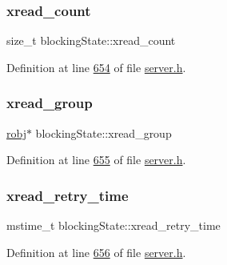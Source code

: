 \subsubsection{\texorpdfstring{xread\+\_\+count}{xread\_count}}
{\footnotesize\ttfamily size\+\_\+t blocking\+State\+::xread\+\_\+count}



Definition at line \hyperlink{server_8h_source_l00654}{654} of file \hyperlink{server_8h_source}{server.\+h}.

\mbox{\label{structblockingState_a2989cf7dbfeca2206cacadbff15e76cf}} 
\subsubsection{\texorpdfstring{xread\+\_\+group}{xread\_group}}
{\footnotesize\ttfamily \hyperlink{structredisObject}{robj}$\ast$ blocking\+State\+::xread\+\_\+group}



Definition at line \hyperlink{server_8h_source_l00655}{655} of file \hyperlink{server_8h_source}{server.\+h}.

\mbox{\label{structblockingState_a2039a8b2c8271aacebe826e9bc7d6244}} 
\subsubsection{\texorpdfstring{xread\+\_\+retry\+\_\+time}{xread\_retry\_time}}
{\footnotesize\ttfamily mstime\+\_\+t blocking\+State\+::xread\+\_\+retry\+\_\+time}



Definition at line \hyperlink{server_8h_source_l00656}{656} of file \hyperlink{server_8h_source}{server.\+h}.

\mbox{\label{structblockingState_af9083ecfc8b1f56b60a25afa76e0dd8e}} 
